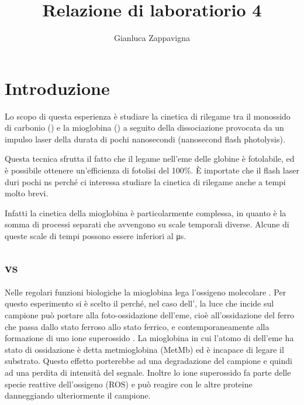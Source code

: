 \documentclass[11pt, a4paper]{article}
\begin{document}
\title{\vspace{-6em}\huge{Relazione di laboratiorio 4}\vspace{-2ex}}
\author{Gianluca Zappavigna}
\maketitle

\section{Introduzione}


Lo scopo di questa esperienza è studiare la cinetica di rilegame tra il monossido di carbonio () e la mioglobina ()
a seguito della dissociazione provocata da un impulso laser della durata di pochi nanosecondi (nanosecond flash photolysis).

Questa tecnica sfrutta il fatto che il legame  nell'eme delle globine è fotolabile, ed è possibile ottenere un'efficienza di fotolisi del 100\%.
È importate che il flash laser duri pochi \unit{\nano\second} perché ci interessa studiare la cinetica di rilegame anche a tempi molto brevi.

Infatti la cinetica della mioglobina è particolarmente complessa, in quanto è la somma di processi separati che avvengono su scale temporali diverse.
Alcune di queste scale di tempi possono essere inferiori al \unit{\micro\second}.


\subsection{\texorpdfstring{}{CO} vs \texorpdfstring{}{O2}}

Nelle regolari funzioni biologiche la mioglobina lega l'ossigeno molecolare .
Per questo esperimento si è scelto il  perché, nel caso dell', la luce che incide sul campione può portare alla foto-ossidazione dell'eme,
cioè all'ossidazione del ferro che passa dallo stato ferroso allo stato ferrico, e contemporaneamente alla formazione di uno ione superossido .
La mioglobina in cui l'atomo di  dell'eme ha stato di ossidazione  è detta metmioglobina (MetMb) ed è incapace di legare il substrato.
Questo effetto porterebbe ad una degradazione del campione e quindi ad una perdita di intensità del segnale. Inoltre lo ione superossido fa parte delle specie reattive dell'ossigeno (ROS) e può reagire
con le altre proteine danneggiando ulteriormente il campione.
\end{document}
